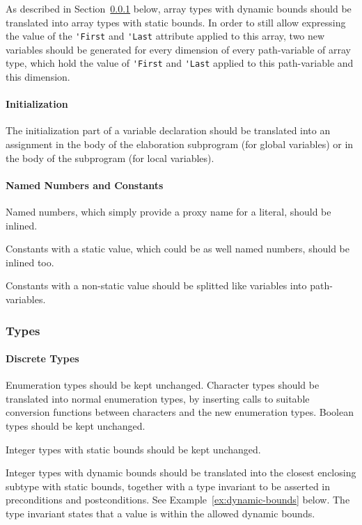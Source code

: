 \documentclass{article}
\begin{document}
As described in Section~\ref{Ada2SPARK:types} below, array types with dynamic
bounds should be translated into array types with static bounds. In order to
still allow expressing the value of the \verb|'First| and \verb|'Last|
attribute applied to this array, two new variables should be generated for
every dimension of every path-variable of array type, which hold the value of
\verb|'First| and \verb|'Last| applied to this path-variable and this
dimension.

\paragraph{Initialization}

The initialization part of a variable declaration should be translated into an
assignment in the body of the elaboration subprogram (for global variables) or
in the body of the subprogram (for local variables).

\paragraph{Named Numbers and Constants}

Named numbers, which simply provide a proxy name for a literal, should be
inlined.

Constants with a static value, which could be as well named numbers, should be
inlined too.

Constants with a non-static value should be splitted like variables into
path-variables.

\subsubsection{Types}
\label{Ada2SPARK:types}

\paragraph{Discrete Types}

Enumeration types should be kept unchanged. Character types should be
translated into normal enumeration types, by inserting calls to suitable
conversion functions between characters and the new enumeration types. Boolean
types should be kept unchanged.

Integer types with static bounds should be kept unchanged.

Integer types with dynamic bounds should be translated into the closest
enclosing subtype with static bounds, together with a type invariant to be
asserted in preconditions and postconditions. See
Example~\ref{ex:dynamic-bounds} below. The type invariant states that a value
is within the allowed dynamic bounds.
\end{document}
